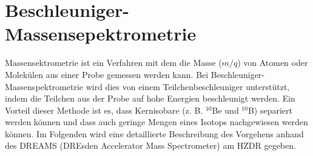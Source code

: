 \section{Beschleuniger-Massensepektrometrie}

Massensektrometrie ist ein Verfahren mit dem die Masse ($m/q$) von Atomen oder Molekülen aus einer Probe gemessen werden kann.
Bei Beschleuniger-Massenspektrometrie wird dies von einem Teilchenbeschleuniger unterstützt, indem die Teilchen aus der Probe auf hohe Energien beschleunigt werden.
Ein Vorteil dieser Methode ist es, dass Kernisobare (z. B. $^{10}$Be und $^{10}$B) separiert werden können und dass auch geringe Mengen eines Isotops nachgewiesen werden können.
Im Folgenden wird eine detaillierte Beschreibung des Vorgehens anhand des DREAMS (DREsden Accelerator Mass Spectrometer) am HZDR gegeben.

